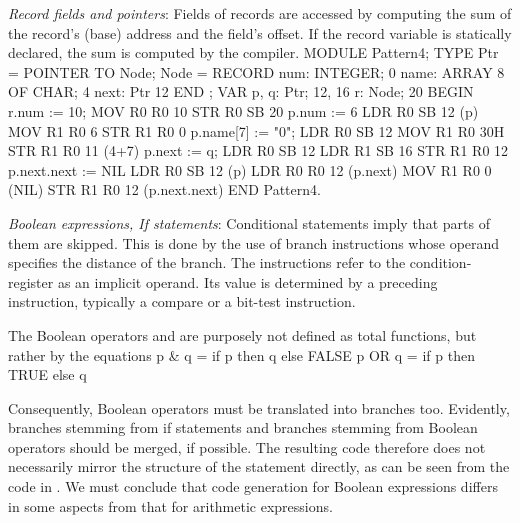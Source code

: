 \noindent {} \emph{Record fields and pointers}: Fields of records are accessed by computing the sum of the record's (base) address and the field's offset. If the record variable is statically declared, the sum is computed by the compiler.
\begintt
MODULE Pattern4;
  TYPE Ptr = POINTER TO Node;
    Node = RECORD num: INTEGER;  0
      name: ARRAY 8 OF CHAR;     4
      next: Ptr                  12
    END ;                        
  VAR p, q: Ptr;                 12, 16
    r: Node;                     20
BEGIN    
  r.num := 10;                   MOV R0 R0 10
                                 STR R0 SB 20
  p.num := 6                     LDR R0 SB 12 (p)
                                 MOV R1 R0 6
                                 STR R1 R0 0
  p.name[7] := "0";              LDR R0 SB 12
                                 MOV R1 R0 30H
                                 STR R1 R0 11 (4+7)
  p.next := q;                   LDR R0 SB 12
                                 LDR R1 SB 16
                                 STR R1 R0 12
  p.next.next := NIL             LDR R0 SB 12 (p)
                                 LDR R0 R0 12 (p.next)
                                 MOV R1 R0 0  (NIL)
                                 STR R1 R0 12 (p.next.next)
END Pattern4.
\endtt

\noindent {} \emph{Boolean expressions, If statements}: Conditional statements imply that parts of them are skipped. This is done by the use of branch instructions whose operand specifies the distance of the branch. The instructions refer to the condition-register as an implicit operand. Its value is determined by a preceding instruction, typically a compare or a bit-test instruction.

The Boolean operators \code{\&} and  are purposely not defined as total functions, but rather by the equations %
\begintt
  p & q  = if p then q else FALSE
  p OR q = if p then TRUE else q
\endtt

\noindent Consequently, Boolean operators must be translated into branches too. Evidently, branches stemming from if statements and branches stemming from Boolean operators should be merged, if possible. The resulting code therefore does not necessarily mirror the structure of the  statement directly, as can be seen from the code in . We must conclude that code generation for Boolean expressions differs in some aspects from that for arithmetic expressions.

